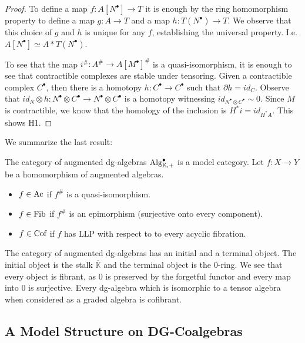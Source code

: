 \documentclass[../thesis.tex]{subfiles}
\begin{document}
\begin{proof}
                To define a map $f : A[N^\bullet] \rightarrow T$ it is enough by the ring homomorphism property to define a map $g : A \rightarrow T$ and a map $h : T(N^\bullet) \rightarrow T$. We observe that this choice of $g$ and $h$ is unique for any $f$, establishing the universal property. I.e. $A[N^\bullet] \simeq A\ast T(N^\bullet)$.
                
                To see that the map $i^\# : A^\# \rightarrow A[M^\bullet]^\#$ is a quasi-isomorphism, it is enough to see that contractible complexes are stable under tensoring. Given a contractible complex $C^\bullet$, then there is a homotopy $h : C^\bullet \rightarrow C^\bullet$ such that $\partial h = id_C$. Observe that $id_N\otimes h : N^\bullet\otimes C^\bullet \rightarrow N^\bullet\otimes C^\bullet$ is a homotopy witnessing $id_{N^\bullet\otimes C^\bullet} \sim 0$. Since $M$ is contractible, we know that the homology of the inclusion is $H^*i = id_{H^*A}$. This shows H1.
            \end{proof}

            We summarize the last result:

            The category of augmented dg-algebras $\tt{Alg}^\bullet_{\mathbb{K},+}$ is a model category. Let $f:X\rightarrow Y$ be a homomorphism of augmented algebras. 
            \begin{itemize}
                \item $f\in \tt{Ac}$ if $f^\#$ is a quasi-isomorphism.
                \item $f\in \tt{Fib}$ if $f^\#$ is an epimorphism (surjective onto every component).
                \item $f\in \tt{Cof}$ if $f$ has LLP with respect to to every acyclic fibration.
            \end{itemize}
            
            The category of augmented dg-algebras has an initial and a terminal object. The initial object is the stalk $\overline{\mathbb{K}}$ and the terminal object is the $0$-ring. We see that every object is fibrant, as $0$ is preserved by the forgetful functor and every map into $0$ is surjective. Every dg-algebra which is isomorphic to a tensor algebra when considered as a graded algebra is cofibrant. 
            
    \subsection{A Model Structure on DG-Coalgebras}
\end{document}
